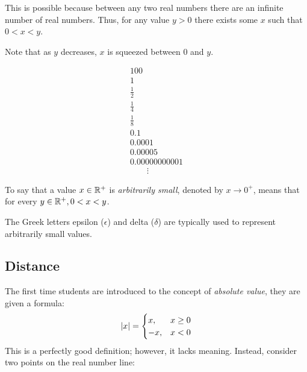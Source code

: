 \documentclass[letterpaper,12pt,fleqn]{article}
\renewcommand{\d}{\delta}
\newcommand{\e}{\epsilon}
\begin{document}
This is possible because between any two real numbers there are an infinite number of real numbers.  Thus, for any
value \(y>0\) there exists some \(x\) such that \(0<x<y\).

\bigskip

\begin{center}
\end{center}

Note that as \(y\) decreases, \(x\) is squeezed between \(0\) and \(y\).

\begin{example}
  \[\begin{array}{l}
  100 \\
  1 \\
  \frac{1}{2} \\
  \frac{1}{4} \\
  \frac{1}{8} \\
  0.1 \\
  0.0001 \\
  0.00005 \\
  0.00000000001 \\
  \qquad\vdots
  \end{array}\]
\end{example}

\begin{definition}
  To say that a value \(x\in\mathbb{R}^+\) is \emph{arbitrarily small}, denoted by \(x\to0^+\), means that for every
  \(y\in\mathbb{R}^+,0<x<y\).
\end{definition}

The Greek letters epsilon (\(\e\)) and delta (\(\d\)) are typically used to represent arbitrarily small values.

\subsection*{Distance}

The first time students are introduced to the concept of \emph{absolute value}, they are given a formula:
\[\lvert x\rvert=\begin{cases}
x, & x\ge0 \\
-x, & x<0
\end{cases}\]
This is a perfectly good definition; however, it lacks meaning.  Instead, consider two points on the real
number line:
\end{document}
